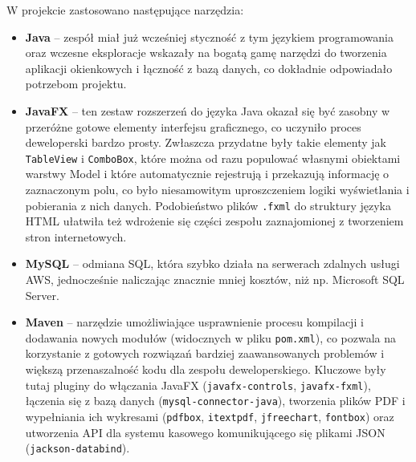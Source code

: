 \documentclass[a4paper,12pt]{article}
\begin{document}
W projekcie zastosowano następujące narzędzia:
\begin{itemize}
    \item \textbf{Java} -- zespół miał już wcześniej styczność z tym językiem programowania oraz wczesne eksploracje wskazały na bogatą gamę narzędzi do tworzenia aplikacji okienkowych i łączność z bazą danych, co dokładnie odpowiadało potrzebom projektu.
    \item \textbf{JavaFX} -- ten zestaw rozszerzeń do języka Java okazał się być zasobny w przeróżne gotowe elementy interfejsu graficznego, co uczyniło proces deweloperski bardzo prosty.
    Zwłaszcza przydatne były takie elementy jak \texttt{TableView} i \texttt{ComboBox}, które można od razu populować własnymi obiektami warstwy Model i które automatycznie rejestrują i przekazują informację o zaznaczonym polu, co było niesamowitym uproszczeniem logiki wyświetlania i pobierania z nich danych.
    Podobieństwo plików \texttt{.fxml} do struktury języka HTML ułatwiła też wdrożenie się części zespołu zaznajomionej z tworzeniem stron internetowych.
    \item \textbf{MySQL} -- odmiana SQL, która szybko działa na serwerach zdalnych usługi AWS, jednocześnie naliczając znacznie mniej kosztów, niż np. Microsoft SQL Server.
    \item \textbf{Maven} -- narzędzie umożliwiające usprawnienie procesu kompilacji i dodawania nowych modułów (widocznych w pliku \texttt{pom.xml}), co pozwala na korzystanie z gotowych rozwiązań bardziej zaawansowanych problemów i większą przenaszalność kodu dla zespołu deweloperskiego.
    Kluczowe były tutaj pluginy do włączania JavaFX (\texttt{javafx-controls}, \texttt{javafx-fxml}), łączenia się z bazą danych (\texttt{mysql-connector-java}), tworzenia plików PDF i wypełniania ich wykresami (\texttt{pdfbox}, \texttt{itextpdf}, \texttt{jfreechart}, \texttt{fontbox}) oraz utworzenia API dla systemu kasowego komunikującego się plikami JSON (\texttt{jackson-databind}).
\end{itemize}
\end{document}
